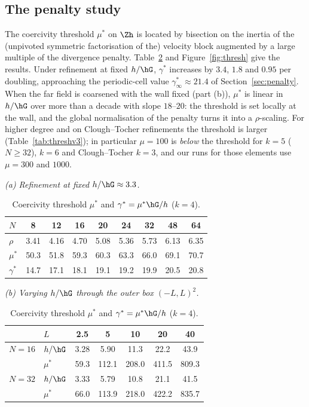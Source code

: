 \subsection{The penalty study}
The coercivity threshold $\mu^\ast$ on $\Zh$ is located by bisection on the inertia of the (unpivoted symmetric factorisation of the) velocity block augmented by a large multiple of the divergence penalty. Table~\ref{tab:thresh} and Figure~\ref{fig:thresh} give the results. Under refinement at fixed $h/\hG$, $\gamma^\ast$ increases by $3.4$, $1.8$ and $0.95$ per doubling, approaching the periodic-cell value $\gamma^\ast_\infty\approx21.4$ of Section~\ref{sec:penalty}. When the far field is coarsened with the wall fixed (part (b)), $\mu^\ast$ is linear in $h/\hG$ over more than a decade with slope $18$--$20$: the threshold is set locally at the wall, and the global normalisation of the penalty turns it into a $\rho$-scaling. For higher degree and on Clough--Tocher refinements the threshold is larger (Table~\ref{tab:threshv3}); in particular $\mu=100$ is \emph{below} the threshold for $k=5$ ($N\ge32$), $k=6$ and Clough--Tocher $k=3$, and our runs for those elements use $\mu=300$ and $1000$.

\begin{table}[t]
\centering\small
\caption{Coercivity threshold $\mu^\ast$ and $\gamma^\ast=\mu^\ast\hG/h$ ($k=4$).}\label{tab:thresh}
\textit{(a) Refinement at fixed $h/\hG\approx3.3$.}\\[2pt]
\begin{tabular}{lcccccccc}
\toprule
$N$ & 8 & 12 & 16 & 20 & 24 & 32 & 48 & 64\\
\midrule
$\rho$ & 3.41 & 4.16 & 4.70 & 5.08 & 5.36 & 5.73 & 6.13 & 6.35\\
$\mu^\ast$ & 50.3 & 51.8 & 59.3 & 60.3 & 63.3 & 66.0 & 69.1 & 70.7\\
$\gamma^\ast$ & 14.7 & 17.1 & 18.1 & 19.1 & 19.2 & 19.9 & 20.5 & 20.8\\
\bottomrule
\end{tabular}\par\vspace{6pt}
\textit{(b) Varying $h/\hG$ through the outer box $(-L,L)^2$.}\\[2pt]
\begin{tabular}{llccccc}
\toprule
 & $L$ & 2.5 & 5 & 10 & 20 & 40\\
\midrule
$N=16$ & $h/\hG$ & 3.28 & 5.90 & 11.3 & 22.2 & 43.9\\
 & $\mu^\ast$ & 59.3 & 112.1 & 208.0 & 411.5 & 809.3\\
\midrule
$N=32$ & $h/\hG$ & 3.33 & 5.79 & 10.8 & 21.1 & 41.5\\
 & $\mu^\ast$ & 66.0 & 113.9 & 218.0 & 422.2 & 835.7\\
\bottomrule
\end{tabular}
\end{table}

